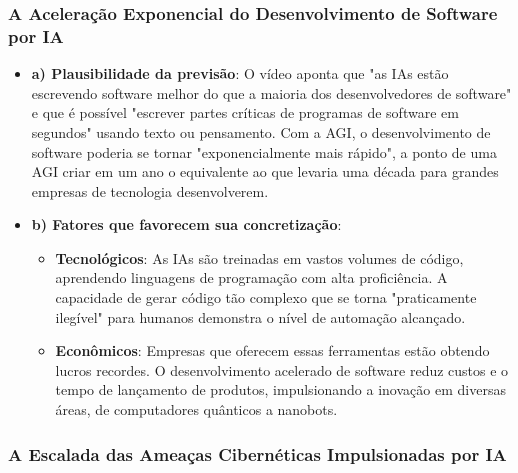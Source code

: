 \documentclass[a4paper,12pt]{article}
\begin{document}
\subsubsection{A Aceleração Exponencial do Desenvolvimento de Software por IA}

\begin{itemize}
\item \textbf{a) Plausibilidade da previsão}: O vídeo aponta que "as IAs estão escrevendo software melhor do que a maioria dos desenvolvedores de software" e que é possível "escrever partes críticas de programas de software em segundos" usando texto ou pensamento. Com a AGI, o desenvolvimento de software poderia se tornar "exponencialmente mais rápido", a ponto de uma AGI criar em um ano o equivalente ao que levaria uma década para grandes empresas de tecnologia desenvolverem.

\item \textbf{b) Fatores que favorecem sua concretização}:
  \begin{itemize}
  \item \textbf{Tecnológicos}: As IAs são treinadas em vastos volumes de código, aprendendo linguagens de programação com alta proficiência. A capacidade de gerar código tão complexo que se torna "praticamente ilegível" para humanos demonstra o nível de automação alcançado.
  \item \textbf{Econômicos}: Empresas que oferecem essas ferramentas estão obtendo lucros recordes. O desenvolvimento acelerado de software reduz custos e o tempo de lançamento de produtos, impulsionando a inovação em diversas áreas, de computadores quânticos a nanobots.
  \end{itemize}
\end{itemize}

\subsubsection{A Escalada das Ameaças Cibernéticas Impulsionadas por IA}
\end{document}
